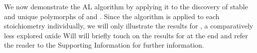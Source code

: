 %



%
We now demonstrate the AL algorithm by applying it to the discovery of stable and unique polymorphs of \IrOtwo and \IrOthree.
%
Since the algorithm is applied to each stoichiometry individually, we will only illustrate the results for \IrOthree, a comparatively less explored oxide
%
Will will briefly touch on the results for \IrOtwo at the end and refer the reader to the Supporting Information for further information.


